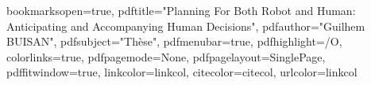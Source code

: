 \usepackage{color}

\hypersetup
{
bookmarksopen=true,
pdftitle="Planning For Both Robot and Human: Anticipating and Accompanying Human Decisions",
pdfauthor="Guilhem BUISAN", %
pdfsubject="Thèse", %
pdfmenubar=true, %
pdfhighlight=/O, %
colorlinks=true, %
pdfpagemode=None, %
pdfpagelayout=SinglePage, %
pdffitwindow=true, %
linkcolor=linkcol, %
citecolor=citecol, %
urlcolor=linkcol %
}


\setcounter{secnumdepth}{3}
\setcounter{tocdepth}{2}


\newcommand{\pd}[2]{\frac{\partial #1}{\partial #2}}
\def\abs{\operatorname{abs}}
\def\argmax{\operatornamewithlimits{arg\,max}}
\def\argmin{\operatornamewithlimits{arg\,min}}
\def\diag{\operatorname{Diag}}
\newcommand{\eqRef}[1]{(\ref{#1})}

\usepackage{rotating}                    %
\usepackage{fancyhdr}                    %

  

\pagestyle{fancy}                       %
\fancyfoot{}                            %

